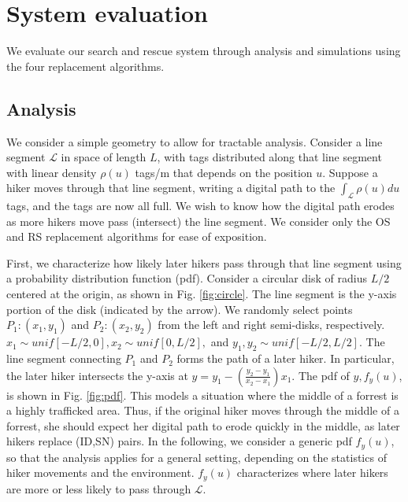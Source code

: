 \documentclass[conference]{IEEEtran}
\begin{document}
\section{System evaluation}
\label{sec:sys_eval}
We evaluate our search and rescue system through analysis and simulations using the four replacement algorithms.

\subsection{Analysis}
We consider a simple geometry to allow for tractable analysis.  Consider a line segment $\mathcal{L}$ in space of length $L$, with tags distributed along that line segment with linear density $\rho\left(u\right)$ tags/m that depends on the position $u$.  Suppose a hiker moves through that line segment, writing a digital path to the  $\int_{\mathcal{L}} \rho\left(u\right) du $ tags, and the tags are now all full.  We wish to know how the digital path erodes as more hikers move pass (intersect) the line segment.  We consider only the OS and RS replacement algorithms for ease of exposition.

First, we characterize how likely later hikers pass through that line segment using a probability distribution function (pdf).  Consider a circular disk of radius $L/2$ centered at the origin, as shown in Fig. \ref{fig:circle}.  The line segment is the y-axis portion of the disk (indicated by the arrow).  We randomly select points $P_1: \left(x_1, y_1\right)$ and $P_2: \left(x_2, y_2\right)$ from the left and right semi-disks, respectively.  $x_1 \sim unif\left[-L/2,0\right], x_2 \sim unif\left[0, L/2\right],$ and $y_1, y_2 \sim unif\left[-L/2, L/2\right]$.  The line segment connecting $P_1$ and $P_2$ forms the path of a later hiker.  In particular, the later hiker intersects the y-axis at $y = y_1 - \left( \frac{y_2-y_1}{x_2-x_1}\right)x_1$.  The pdf of $y, f_y\left(u\right)$, is shown in Fig. \ref{fig:pdf}.  This models a situation where the middle of a forrest is a highly trafficked area.  Thus, if the original hiker moves through the middle of a forrest, she should expect her digital path to erode quickly in the middle, as later hikers replace (ID,SN) pairs.  In the following, we consider a generic pdf $f_y\left(u\right)$, so that the analysis applies for a general setting, depending on the statistics of hiker movements and the environment.  $f_y\left(u\right)$ characterizes where later hikers are more or less likely to pass through $\mathcal{L}$.
\end{document}
